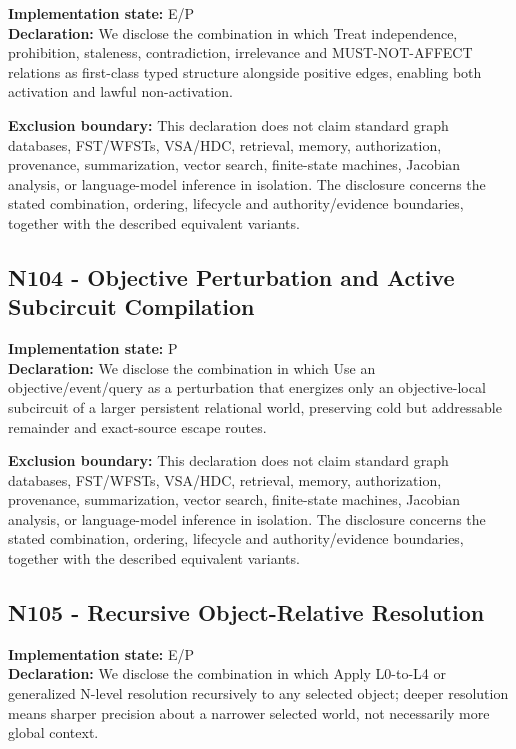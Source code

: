 \documentclass[
  10pt,
  letterpaper,
]{article}
\begin{document}
\textbf{Implementation state:} E/P\\
\textbf{Declaration:} We disclose the combination in which Treat
independence, prohibition, staleness, contradiction, irrelevance and
MUST-NOT-AFFECT relations as first-class typed structure alongside
positive edges, enabling both activation and lawful non-activation.

\textbf{Exclusion boundary:} This declaration does not claim standard
graph databases, FST/WFSTs, VSA/HDC, retrieval, memory, authorization,
provenance, summarization, vector search, finite-state machines,
Jacobian analysis, or language-model inference in isolation. The
disclosure concerns the stated combination, ordering, lifecycle and
authority/evidence boundaries, together with the described equivalent
variants.

\subsection{N104 - Objective Perturbation and Active Subcircuit
Compilation}\label{n104---objective-perturbation-and-active-subcircuit-compilation}

\textbf{Implementation state:} P\\
\textbf{Declaration:} We disclose the combination in which Use an
objective/event/query as a perturbation that energizes only an
objective-local subcircuit of a larger persistent relational world,
preserving cold but addressable remainder and exact-source escape
routes.

\textbf{Exclusion boundary:} This declaration does not claim standard
graph databases, FST/WFSTs, VSA/HDC, retrieval, memory, authorization,
provenance, summarization, vector search, finite-state machines,
Jacobian analysis, or language-model inference in isolation. The
disclosure concerns the stated combination, ordering, lifecycle and
authority/evidence boundaries, together with the described equivalent
variants.

\subsection{N105 - Recursive Object-Relative
Resolution}\label{n105---recursive-object-relative-resolution}

\textbf{Implementation state:} E/P\\
\textbf{Declaration:} We disclose the combination in which Apply
L0-to-L4 or generalized N-level resolution recursively to any selected
object; deeper resolution means sharper precision about a narrower
selected world, not necessarily more global context.
\end{document}
